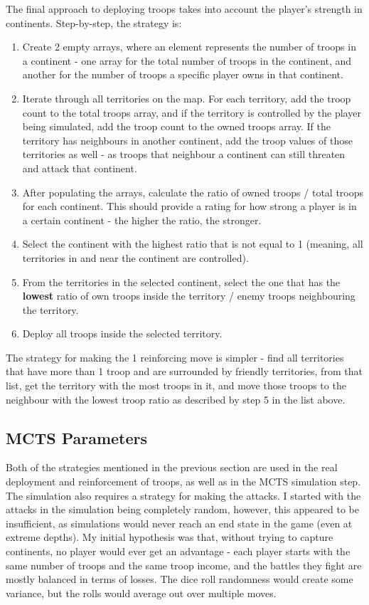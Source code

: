 The final approach to deploying troops takes into account the player's strength in continents. Step-by-step, the strategy is:
\begin{enumerate}
\item Create 2 empty arrays, where an element represents the number of troops in a continent - one array for the total number of troops in the continent, and another for the number of troops a specific player owns in that continent.
\item Iterate through all territories on the map. For each territory, add the troop count to the total troops array, and if the territory is controlled by the player being simulated, add the troop count to the owned troops array. If the territory has neighbours in another continent, add the troop values of those territories as well - as troops that neighbour a continent can still threaten and attack that continent.
\item After populating the arrays, calculate the ratio of owned troops / total troops for each continent. This should provide a rating for how strong a player is in a certain continent - the higher the ratio, the stronger.
\item Select the continent with the highest ratio that is not equal to 1 (meaning, all territories in and near the continent are controlled).
\item From the territories in the selected continent, select the one that has the \textbf{lowest} ratio of own troops inside the territory / enemy troops neighbouring the territory.
\item Deploy all troops inside the selected territory.
\end{enumerate}

The strategy for making the 1 reinforcing move is simpler - find all territories that have more than 1 troop and are surrounded by friendly territories, from that list, get the territory with the most troops in it, and move those troops to the neighbour with the lowest troop ratio as described by step 5 in the list above.

\subsection{MCTS Parameters}
\label{MCTSParameters}

Both of the strategies mentioned in the previous section are used in the real deployment and reinforcement of troops, as well as in the MCTS simulation step. The simulation also requires a strategy for making the attacks. I started with the attacks in the simulation being completely random, however, this appeared to be insufficient, as simulations would never reach an end state in the game (even at extreme depths). My initial hypothesis was that, without trying to capture continents, no player would ever get an advantage - each player starts with the same number of troops and the same troop income, and the battles they fight are mostly balanced in terms of losses. The dice roll randomness would create some variance, but the rolls would average out over multiple moves.

